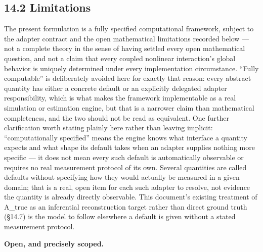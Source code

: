 \documentclass[
]{article}
\begin{document}
\hypertarget{limitations}{%
\subsection{14.2 Limitations}\label{limitations}}

The present formulation is a fully specified computational framework,
subject to the adapter contract and the open mathematical limitations
recorded below --- not a complete theory in the sense of having settled
every open mathematical question, and not a claim that every coupled
nonlinear interaction's global behavior is uniquely determined under
every implementation circumstance. ``Fully computable'' is deliberately
avoided here for exactly that reason: every abstract quantity has either
a concrete default or an explicitly delegated adapter responsibility,
which is what makes the framework implementable as a real simulation or
estimation engine, but that is a narrower claim than mathematical
completeness, and the two should not be read as equivalent. One further
clarification worth stating plainly here rather than leaving implicit:
``computationally specified'' means the engine knows what interface a
quantity expects and what shape its default takes when an adapter
supplies nothing more specific --- it does not mean every such default
is automatically observable or requires no real measurement protocol of
its own. Several quantities are called defaults without specifying how
they would actually be measured in a given domain; that is a real, open
item for each such adapter to resolve, not evidence the quantity is
already directly observable. This document's existing treatment of
A\_true as an inferential reconstruction target rather than direct
ground truth (§14.7) is the model to follow elsewhere a default is given
without a stated measurement protocol.

\textbf{Open, and precisely scoped.}
\end{document}
